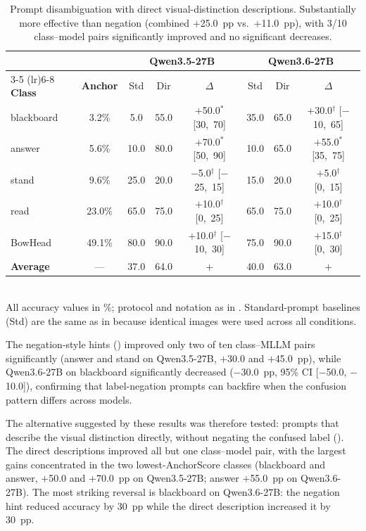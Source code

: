 \documentclass[11pt,a4paper]{article}
\begin{document}
\begin{table}[t]
\caption{Prompt disambiguation with direct visual-distinction descriptions. Substantially more effective than negation (combined $+$25.0~pp vs.\ $+$11.0~pp), with 3/10 class--model pairs significantly improved and no significant decreases.}
\label{tab:prompt_opt_direct}
\centering
\footnotesize
\setlength{\tabcolsep}{3pt}
\begin{tabular}{lccccccc}
\toprule
& & \multicolumn{3}{c}{\textbf{Qwen3.5-27B}} & \multicolumn{3}{c}{\textbf{Qwen3.6-27B}} \\
\cmidrule(lr){3-5} \cmidrule(lr){6-8}
\textbf{Class} & \textbf{Anchor} & Std & Dir & $\Delta$ & Std & Dir & $\Delta$ \\
\midrule
blackboard & 3.2\% & 5.0 & 55.0 & $+$50.0$^*$ [30,~70] & 35.0 & 65.0 & $+$30.0$^\dagger$ [$-$10,~65] \\
answer & 5.6\% & 10.0 & 80.0 & $+$70.0$^*$ [50,~90] & 10.0 & 65.0 & $+$55.0$^*$ [35,~75] \\
stand & 9.6\% & 25.0 & 20.0 & $-$5.0$^\dagger$ [$-$25,~15] & 15.0 & 20.0 & $+$5.0$^\dagger$ [0,~15] \\
read & 23.0\% & 65.0 & 75.0 & $+$10.0$^\dagger$ [0,~25] & 65.0 & 75.0 & $+$10.0$^\dagger$ [0,~25] \\
BowHead & 49.1\% & 80.0 & 90.0 & $+$10.0$^\dagger$ [$-$10,~30] & 75.0 & 90.0 & $+$15.0$^\dagger$ [0,~30] \\
\textbf{Average} & --- & 37.0 & 64.0 & \textbf{\boldmath$+$\unboldmath27.0} & 40.0 & 63.0 & \textbf{\boldmath$+$\unboldmath23.0} \\
\bottomrule
\end{tabular}
\\[2pt]
\footnotesize{All accuracy values in \%; protocol and notation as in . Standard-prompt baselines (Std) are the same as in  because identical images were used across all conditions.}
\end{table}

The negation-style hints () improved only two of ten class--MLLM pairs significantly (answer and stand on Qwen3.5-27B, $+$30.0 and $+$45.0~pp), while Qwen3.6-27B on blackboard significantly decreased ($-$30.0~pp, 95\% CI [$-$50.0, $-$10.0]), confirming that label-negation prompts can backfire when the confusion pattern differs across models.

The alternative suggested by these results was therefore tested: prompts that describe the visual distinction directly, without negating the confused label (). The direct descriptions improved all but one class--model pair, with the largest gains concentrated in the two lowest-AnchorScore classes (blackboard and answer, $+$50.0 and $+$70.0~pp on Qwen3.5-27B; answer $+$55.0~pp on Qwen3.6-27B). The most striking reversal is blackboard on Qwen3.6-27B: the negation hint reduced accuracy by 30~pp while the direct description increased it by 30~pp.
\end{document}
